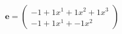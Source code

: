 \documentclass[preview]{standalone}
\begin{document}
\begin{align*}
\mathbf{e} = \begin{pmatrix}-1 + 1x^{1} + 1x^{2} + 1x^{3} \\ -1 + 1x^{1} + -1x^{2}\end{pmatrix}
\end{align*}
\end{document}
